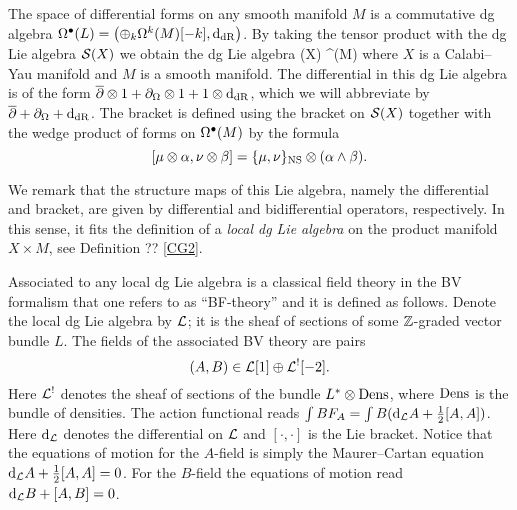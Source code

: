 \documentclass[11pt]{amsart}
\def\pv{{\rm PV}}
\begin{document}



The space of differential forms on any smooth manifold $M$ is a commutative dg algebra $\Omega^{\bullet}(L) = \left(\oplus_{k}\Omega^{k}(M)[-k], {\rm d}_{{\rm dR}}\right)$.
By taking the tensor product with the dg Lie algebra $\mathcal S(X)$ we obtain the dg Lie algebra
\beqn\label{localLie}
  \cS(X) \; \Hat{\otimes} \; \Omega^{\bu}(M)
\eeqn
where $X$ is a Calabi--Yau manifold and $M$ is a smooth manifold.
The differential in this dg Lie algebra is of the form $\overline{\partial} \otimes 1 + \partial_\Omega \otimes 1 + 1 \otimes {\rm d}_{\rm dR}$, which we will abbreviate by $\overline{\partial} + \partial_\Omega + {\rm d}_{\rm dR}$.
The bracket is defined using the bracket on $\mathcal S(X)$ together with the wedge product of forms on $\Omega^\bullet(M)$ by the formula
\[
  [\mu \otimes \alpha, \nu \otimes \beta] = \{\mu, \nu\}_{\rm NS} \otimes (\alpha \wedge \beta) .
\]

We remark that the structure maps of this Lie algebra, namely the differential and bracket, are given by differential and bidifferential operators, respectively.
In this sense, it fits the definition of a {\em local dg Lie algebra} on the product manifold $X \times M$, see Definition ?? \ref{CG2}.

Associated to any local dg Lie algebra is a classical field theory in the BV formalism that one refers to as ``BF-theory'' and it is defined as follows.
Denote the local dg Lie algebra by $\mathcal L$; it is the sheaf of sections of some $\mathbb Z$-graded vector bundle $L$. 
The fields of the associated BV theory are pairs
\[
  (A, B) \in \mathcal L[1] \oplus \mathcal L^{!}[-2] .
\]
Here $\mathcal L^!$ denotes the sheaf of sections of the bundle $L^* \otimes {\rm Dens}$, where ${\rm Dens}$ is the bundle of densities. 
The action functional reads $\int B F_{A} = \int B ({\rm d}_{\mathcal L}A + \frac12 [A,A])$.
Here ${\rm d}_{\mathcal L}$ denotes the differential on $\mathcal L$ and $[\cdot,\cdot]$ is the Lie bracket.
Notice that the equations of motion for the $A$-field is simply the Maurer--Cartan equation ${\rm d}_\mathcal L A + \frac12 [A,A] = 0$.
For the $B$-field the equations of motion read ${\rm d}_\mathcal L B + [A, B] = 0$.
\end{document}
